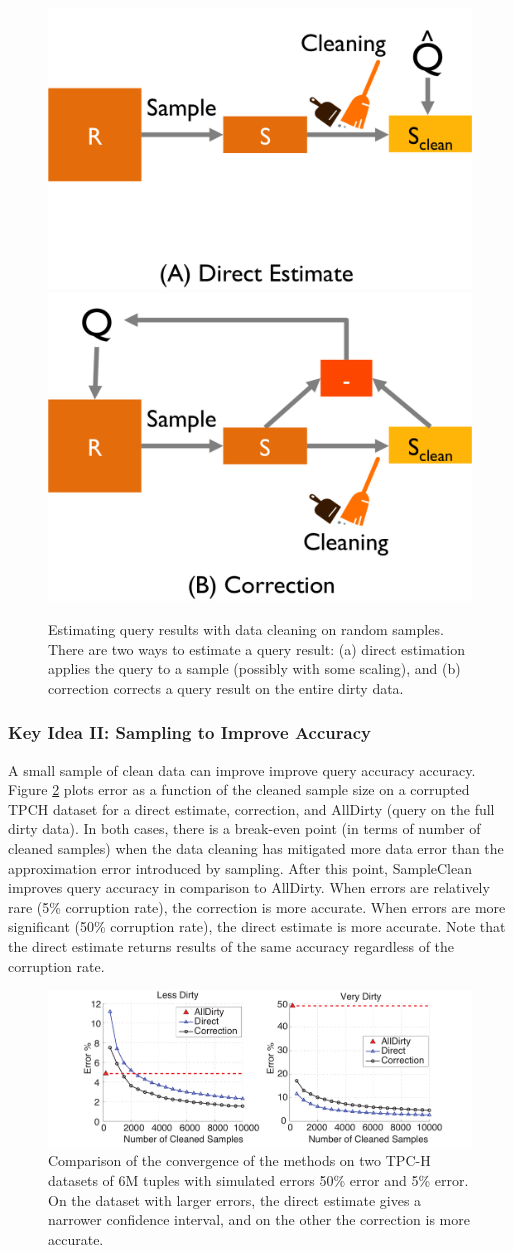 \begin{figure}\centering
\includegraphics[width=.3\columnwidth]{figs/est1b.png}
\hspace{2em}
\includegraphics[width=.3\columnwidth]{figs/est1c.png}
\caption{Estimating query results with data cleaning on random samples. There are two ways to estimate a query result: (a) direct estimation applies the query to a sample (possibly with some scaling), and (b) correction corrects a query result on the entire dirty data.\label{fig:est}}
\end{figure}

\subsubsection{Key Idea II: Sampling to Improve Accuracy}
A small sample of clean data can improve improve query accuracy accuracy.
Figure \ref{fig:est2} plots error as a function of the cleaned sample size on a corrupted TPCH dataset for a direct estimate, correction, and AllDirty (query on the full dirty data).
In both cases, there is a break-even point (in terms of number of cleaned samples) when the data cleaning has mitigated more data error than the approximation error introduced by sampling.
After this point, SampleClean improves query accuracy in comparison to AllDirty.
When errors are relatively rare (5\% corruption rate), the correction is more accurate. 
When errors are more significant (50\% corruption rate), the direct estimate is more accurate.
Note that the direct estimate returns results of the same accuracy regardless of the corruption rate. 

\begin{figure}
\includegraphics[width=.6\columnwidth]{figs/allerror-samplesize.pdf}
\caption{Comparison of the convergence of the methods on two TPC-H datasets of 6M tuples with simulated errors 50\% error and 5\% error. On the dataset with larger errors, the direct estimate gives a narrower confidence interval, and on the other the correction is more accurate. \label{fig:est2}}
\end{figure}



